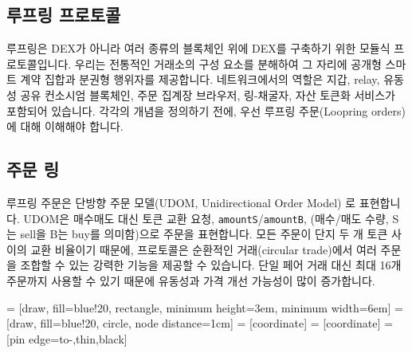 \documentclass[UTF8,nofonts]{article}
\makeatletter
\newenvironment{figurehere}
 {\def\@captype{figure}}
 {}
\makeatother
\begin{document}
\begin{multicols}{2}
\section{루프링 프로토콜\label{sec:loopring_protocol}}
루프링은 DEX가 아니라 여러 종류의 블록체인 위에 DEX를 구축하기 위한 모듈식 프로토콜입니다. 우리는 전통적인 거래소의 구성 요소를 분해하여 그 자리에 공개형 스마트 계약 집합과 분권형 행위자를 제공합니다. 네트워크에서의 역할은 지갑, relay, 유동성 공유 컨소시엄 블록체인, 주문 집계장 브라우저, 링-채굴자, 자산 토큰화 서비스가 포함되어 있습니다. 각각의 개념을 정의하기 전에, 우선 루프링 주문(Loopring orders)에 대해 이해해야 합니다. 

\subsection{주문 링\label{sec:order_ring}}
루프링 주문은 단방향 주문 모델(UDOM, Unidirectional Order Model)\cite{coinport2014udom} 로 표현합니다. UDOM은 매수매도 대신 토큰 교환 요청, \verb|amountS|/\verb|amountB|, (매수/매도 수량, S는 sell을 B는 buy를 의미함)으로 주문을 표현합니다. 모든 주문이 단지 두 개 토큰 사이의 교환 비율이기 때문에,  프로토콜은 순환적인 거래(circular trade)에서 여러 주문을 조합할 수 있는 강력한 기능을 제공할 수 있습니다. 단일 페어 거래 대신 최대 16개 주문까지 사용할 수 있기 때문에 유동성과 가격 개선 가능성이 많이 증가합니다.  

\begin{center}
\begin{figurehere}
\centering
{} = [draw, fill=blue!20, rectangle, 
    minimum height=3em, minimum width=6em]
 = [draw, fill=blue!20, circle, node distance=1cm]
 = [coordinate]
 = [coordinate]
 = [pin edge={to-,thin,black}]

\end{figurehere}
\end{center}
\end{multicols}
\end{document}
